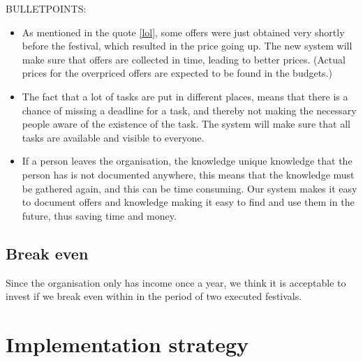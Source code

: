 BULLETPOINTS:
\begin{itemize}
    \item As mentioned in the quote \ref{lol}, some offers were just obtained very shortly before
    the festival, which resulted in the price going up. The new system will make sure that offers
    are collected in time, leading to better prices. (Actual prices for the overpriced offers are
    expected to be found in the budgets.)
    \item The fact that a lot of tasks are put in different places, means that there is a chance of
    missing a deadline for a task, and thereby not making the necessary people aware of the
    existence of the task. The system will make sure that all tasks are available and visible to
    everyone.
    \item If a person leaves the organisation, the knowledge unique knowledge that the person has is
    not documented anywhere, this means that the knowledge must be gathered again, and this can be
    time consuming. Our system makes it easy to document offers and knowledge making it easy to find
    and use them in the future, thus saving time and money.
\end{itemize}

\subsection{Break even}
\label{sub:break_even}
Since the organisation only has income once a year, we think it is acceptable to invest if we break
even within in the period of two executed festivals.

\section{Implementation strategy}


